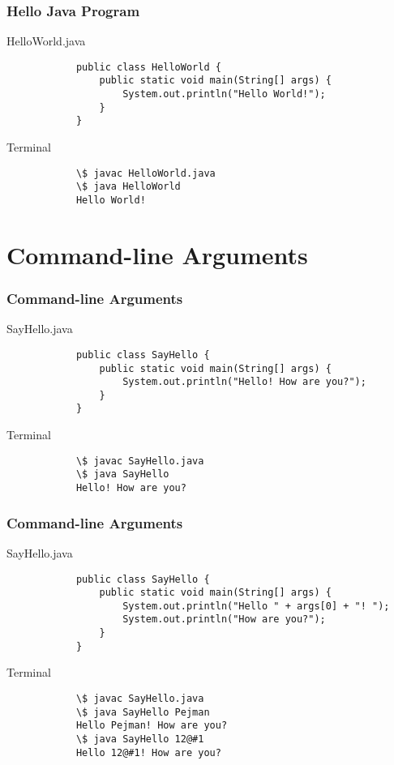\documentclass[10pt, compress]{beamer}
\begin{document}
\begin{frame}[fragile]
	\frametitle{Hello Java Program}
	\begin{block}{HelloWorld.java}
		\begin{verbatim}
			public class HelloWorld {
			    public static void main(String[] args) {
			        System.out.println("Hello World!");
			    }
			}
		\end{verbatim}
	\end{block}
	\begin{block}{Terminal}
		\begin{verbatim}
			\$ javac HelloWorld.java
			\$ java HelloWorld
			Hello World!
		\end{verbatim}
	\end{block}
\end{frame}

\section{Command-line Arguments}

\begin{frame}[fragile]
	\frametitle{Command-line Arguments}
	\begin{block}{SayHello.java}
		\begin{verbatim}
			public class SayHello {
			    public static void main(String[] args) {
			        System.out.println("Hello! How are you?");
			    }
			}
		\end{verbatim}
	\end{block}
	\begin{block}{Terminal}
		\begin{verbatim}
			\$ javac SayHello.java
			\$ java SayHello
			Hello! How are you?
		\end{verbatim}
	\end{block}
\end{frame}

\begin{frame}[fragile]
	\frametitle{Command-line Arguments}
	\begin{block}{SayHello.java}
		\begin{verbatim}
			public class SayHello {
			    public static void main(String[] args) {
			        System.out.println("Hello " + args[0] + "! ");
			        System.out.println("How are you?");
			    }
			}
		\end{verbatim}
	\end{block}
	\begin{block}{Terminal}
		\begin{verbatim}
			\$ javac SayHello.java
			\$ java SayHello Pejman
			Hello Pejman! How are you?
			\$ java SayHello 12@#1
			Hello 12@#1! How are you?
		\end{verbatim}
	\end{block}
\end{frame}
\end{document}
